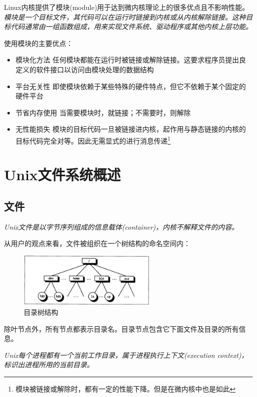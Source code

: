    Linux内核提供了模块(module)用于达到微内核理论上的很多优点且不影响性能。\emph{模块是一个目标文件，其代码可以在运行时链接到内核或从内核解除链接。这种目标代码通常由一组函数组成，用来实现文件系统、驱动程序或其他内核上层功能。}

    使用模块的主要优点：

\begin{itemize}
    \item [1)] 模块化方法
    \subitem 任何模块都能在运行时被链接或解除链接。这要求程序员提出良定义的软件接口以访问由模块处理的数据结构
    \item [2)] 平台无关性
    \subitem 即使模块依赖于某些特殊的硬件特点，但它不依赖于某个固定的硬件平台
    \item [3)] 节省内存使用
    \subitem 当需要模块时，就链接；不需要时，则解除
    \item [4)] 无性能损失
    \subitem 模块的目标代码一旦被链接进内核，起作用与静态链接的内核的目标代码完全对等。因此无需显式的进行消息传递\footnote[1]{模块被链接或解除时，都有一定的性能下降。但是在微内核中也是如此}
\end{itemize}

\section{Unix文件系统概述}

\subsection{文件}

    \emph{Unix文件是以字节序列组成的信息载体(container)，内核不解释文件的内容。}

    从用户的观点来看，文件被组织在一个树结构的命名空间内：

\begin{figure}[!htbp]
    \centering
    \includegraphics[width=0.6\textwidth]{image/chapter01/目录树结构.png}
    \caption{目录树结构}
\end{figure}

    除叶节点外，所有节点都表示目录名。目录节点包含它下面文件及目录的所有信息。

    \emph{Unix每个进程都有一个当前工作目录，属于进程执行上下文(execution context)，标识出进程所用的当前目录。}

